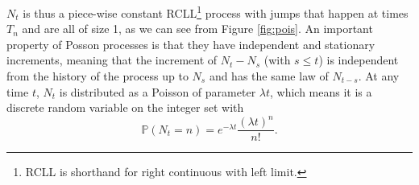$N_t$ is thus a piece-wise constant RCLL\footnote{RCLL is shorthand for right continuous with left limit.} process with jumps that happen at times $T_n$ and are all of size 1, as we can see from Figure \ref{fig:pois}.
An important property of Posson processes is that they have independent and stationary increments, meaning that the increment of $N_t - N_s$ (with $s\leq t$) is independent from the history of the process up to $N_s$ and has the same law of $N_{t-s}$.
At any time $t$, $N_t$ is distributed as a Poisson of parameter $\lambda t$, which means it is a discrete random variable on the integer set with
\begin{equation}
\label{eq:pois_pdf}
\mathbb{P}( N_t = n) = e^{-\lambda t}\frac{(\lambda t)^n}{n!}.
\end{equation}



